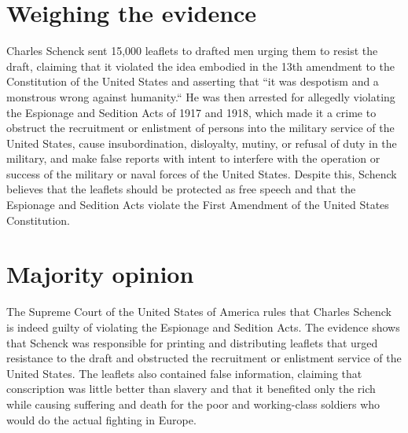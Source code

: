 \documentclass[a4paper, 12pt]{article}
\begin{document}
 
\tableofcontents
\pagebreak
\section{Weighing the evidence}
\hspace{\parindent} Charles Schenck sent 15,000 leaflets to drafted men urging them to resist the draft, claiming that it violated the idea embodied in the 13th amendment to the Constitution of the United States and asserting that ``it was despotism and a monstrous wrong against humanity.`` He was then arrested for allegedly violating the Espionage and Sedition Acts of 1917 and 1918, which made it a crime to obstruct the recruitment or enlistment of persons into the military service of the United States, cause insubordination, disloyalty, mutiny, or refusal of duty in the military, and make false reports with intent to interfere with the operation or success of the military or naval forces of the United States. Despite this, Schenck believes that the leaflets should be protected as free speech and that the Espionage and Sedition Acts violate the First Amendment of the United States Constitution. 

\newpage
\section{Majority opinion}
\hspace{\parindent} The Supreme Court of the United States of America rules that Charles Schenck is indeed guilty of violating the Espionage and Sedition Acts. The evidence shows that Schenck was responsible for printing and distributing leaflets that urged resistance to the draft and obstructed the recruitment or enlistment service of the United States. The leaflets also contained false information, claiming that conscription was little better than slavery and that it benefited only the rich while causing suffering and death for the poor and working-class soldiers who would do the actual fighting in Europe.
\end{document}
